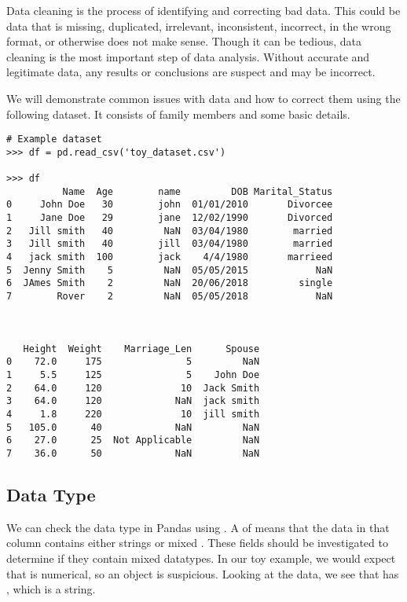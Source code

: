 
Data cleaning is the process of identifying and correcting bad data.
This could be data that is missing, duplicated, irrelevant, inconsistent, incorrect, in the wrong format, or otherwise does not make sense.
Though it can be tedious, data cleaning is the most important step of data analysis.
Without accurate and legitimate data, any results or conclusions are suspect and may be incorrect.

We will demonstrate common issues with data and how to correct them using the following dataset.
It consists of family members and some basic details.

\begin{lstlisting}
# Example dataset
>>> df = pd.read_csv('toy_dataset.csv')

>>> df
          Name  Age        name         DOB Marital_Status
0     John Doe   30        john  01/01/2010       Divorcee
1     Jane Doe   29    	   jane	 12/02/1990       Divorced
2   Jill smith   40         NaN  03/04/1980        married
3   Jill smith   40  	   jill  03/04/1980        married
4   jack smith  100        jack    4/4/1980       marrieed
5  Jenny Smith    5         NaN  05/05/2015            NaN
6  JAmes Smith    2         NaN  20/06/2018         single
7        Rover    2         NaN  05/05/2018            NaN



   Height  Weight    Marriage_Len      Spouse
0    72.0     175               5         NaN
1     5.5     125               5    John Doe
2    64.0     120              10  Jack Smith
3    64.0     120             NaN  jack smith
4     1.8     220              10  jill smith
5   105.0      40             NaN         NaN
6    27.0      25  Not Applicable         NaN
7    36.0      50             NaN         NaN

\end{lstlisting}



\subsection*{Data Type}

We can check the data type in Pandas using .
A  of  means that the data in that column contains either strings or mixed . 
These fields should be investigated to determine if they contain mixed datatypes.
In our toy example, we would expect that  is numerical, so an object  is suspicious. 
Looking at the data, we see that  has , which is a string.


